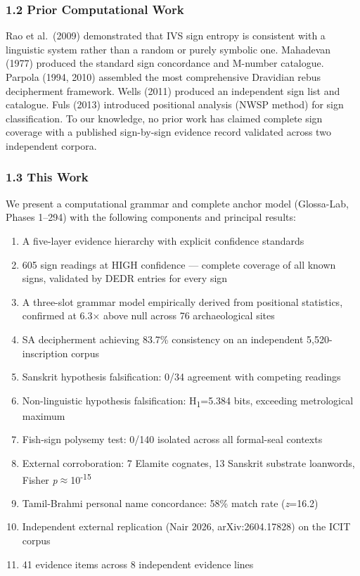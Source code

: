 \documentclass[
  11pt,
]{article}
\providecommand{\tightlist}{%
  \setlength{\itemsep}{0pt}\setlength{\parskip}{0pt}}
\begin{document}
\subsubsection{1.2 Prior Computational
Work}\label{prior-computational-work}

Rao et al.~(2009) demonstrated that IVS sign entropy is consistent with
a linguistic system rather than a random or purely symbolic one.
Mahadevan (1977) produced the standard sign concordance and M-number
catalogue. Parpola (1994, 2010) assembled the most comprehensive
Dravidian rebus decipherment framework. Wells (2011) produced an
independent sign list and catalogue. Fuls (2013) introduced positional
analysis (NWSP method) for sign classification. To our knowledge, no
prior work has claimed complete sign coverage with a published
sign-by-sign evidence record validated across two independent corpora.

\subsubsection{1.3 This Work}\label{this-work}

We present a computational grammar and complete anchor model
(Glossa-Lab, Phases 1--294) with the following components and principal
results:

\begin{enumerate}
\def\labelenumi{\arabic{enumi}.}
\tightlist
\item
  A five-layer evidence hierarchy with explicit confidence standards
\item
  605 sign readings at HIGH confidence --- complete coverage of all
  known signs, validated by DEDR entries for every sign
\item
  A three-slot grammar model empirically derived from positional
  statistics, confirmed at 6.3× above null across 76 archaeological
  sites
\item
  SA decipherment achieving 83.7\% consistency on an independent
  5,520-inscription corpus
\item
  Sanskrit hypothesis falsification: 0/34 agreement with competing
  readings
\item
  Non-linguistic hypothesis falsification: H\textsubscript{1}=5.384
  bits, exceeding metrological maximum
\item
  Fish-sign polysemy test: 0/140 isolated across all formal-seal
  contexts
\item
  External corroboration: 7 Elamite cognates, 13 Sanskrit substrate
  loanwords, Fisher \emph{p}$\approx$10\textsuperscript{-15}
\item
  Tamil-Brahmi personal name concordance: 58\% match rate
  (\emph{z}=16.2)
\item
  Independent external replication (Nair 2026, arXiv:2604.17828) on the
  ICIT corpus
\item
  41 evidence items across 8 independent evidence lines
\end{enumerate}
\end{document}
